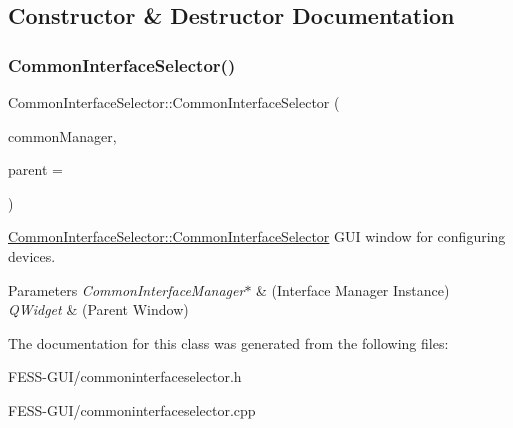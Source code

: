 \subsection{Constructor \& Destructor Documentation}
\hypertarget{class_common_interface_selector_a46da3e73aa0868810dbd80a42281a6c8}{}\label{class_common_interface_selector_a46da3e73aa0868810dbd80a42281a6c8} 
\subsubsection{\texorpdfstring{Common\+Interface\+Selector()}{CommonInterfaceSelector()}}
{\footnotesize\ttfamily Common\+Interface\+Selector\+::\+Common\+Interface\+Selector (\begin{DoxyParamCaption}\item[{\hyperlink{class_common_interface_manager}{Common\+Interface\+Manager} $\ast$}]{common\+Manager,  }\item[{Q\+Widget $\ast$}]{parent = {} }\end{DoxyParamCaption})\hspace{0.3cm}{\ttfamily [explicit]}}



\hyperlink{class_common_interface_selector_a46da3e73aa0868810dbd80a42281a6c8}{Common\+Interface\+Selector\+::\+Common\+Interface\+Selector} G\+UI window for configuring devices. 


\begin{DoxyParams}{Parameters}
{\em Common\+Interface\+Manager$\ast$} & (Interface Manager Instance) \\
\hline
{\em Q\+Widget} & (Parent Window) \\
\hline
\end{DoxyParams}


The documentation for this class was generated from the following files\+:\begin{DoxyCompactItemize}
\item 
F\+E\+S\+S-\/\+G\+U\+I/commoninterfaceselector.\+h\item 
F\+E\+S\+S-\/\+G\+U\+I/commoninterfaceselector.\+cpp\end{DoxyCompactItemize}
